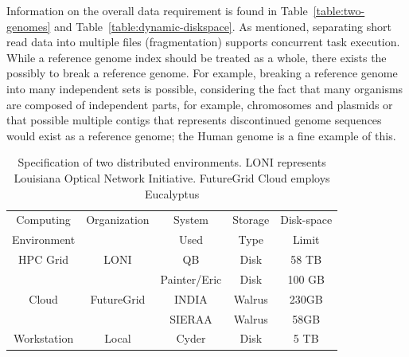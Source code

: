 \documentclass{cpeauth}
\begin{document}

Information on the overall data requirement is found in
Table~\ref{table:two-genomes} and
Table~\ref{table:dynamic-diskspace}. As mentioned, separating short
read data into multiple files (fragmentation) supports concurrent task
execution.  While a reference genome index should be treated as a
whole, there exists the possibly to break a reference genome.  For
example, breaking a reference genome into many independent sets is
possible, considering the fact that many organisms are composed of
independent parts, for example, chromosomes and plasmids or that
possible multiple contigs that represents discontinued genome
sequences would exist as a reference genome; the Human genome is a
fine example of this.

\begin{table}
\small
\begin{tabular}{|c|c|c|c|c|} 
\hline 
Computing & Organization & System &  Storage & Disk-space  \\
Environment & & Used & Type  &  Limit \\ \hline
HPC Grid & LONI & QB & Disk & 58 TB   \\
 &  &  Painter/Eric  & Disk &  100 GB  \\
Cloud & FutureGrid & INDIA & Walrus & 230GB \\
         &                    &  SIERAA & Walrus & 58GB \\ 
Workstation &  Local   &  Cyder & Disk       & 5 TB\\

 \hline


 \end{tabular}
\caption{Specification of two distributed environments. LONI represents Louisiana Optical Network Initiative\cite{loni}. FutureGrid Cloud\cite{futuregrid} employs Eucalyptus}
\label{table:two-systems} 
\end{table}


\end{document}
